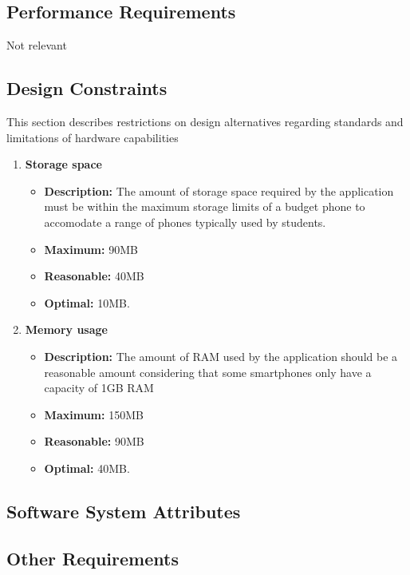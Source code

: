 \documentclass{article}
\begin{document}
	
	\subsection{Performance Requirements}
	Not relevant
	
	\subsection{Design Constraints}
	This section describes restrictions on design alternatives regarding standards and limitations of hardware capabilities
	\begin{enumerate}
		\item \textbf{Storage space}
		\begin{itemize}
			\item \textbf{Description:} The amount of storage space required by the application must be within the maximum storage limits of a budget phone to accomodate a range of phones typically used by students.
			\item \textbf{Maximum:} 90MB
			\item \textbf{Reasonable:} 40MB
			\item \textbf{Optimal:} 10MB.\newline
		\end{itemize}
	
		\item \textbf{Memory usage}
		\begin{itemize}
			\item \textbf{Description:} The amount of RAM used by the application should be a reasonable amount considering that some smartphones only have a capacity of 1GB RAM
			\item \textbf{Maximum:} 150MB
			\item \textbf{Reasonable:} 90MB
			\item \textbf{Optimal:} 40MB.\newline
		\end{itemize}
	\end{enumerate}
	
	\subsection{Software System Attributes}
	\subsection{Other Requirements}
\end{document}
